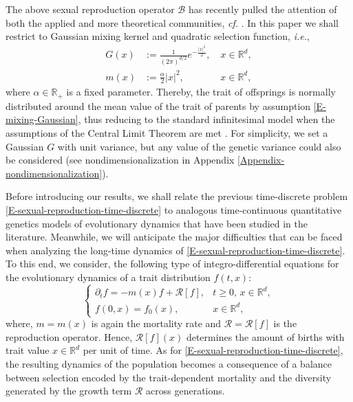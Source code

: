 \documentclass[reqno]{amsart}
\numberwithin{equation}{section}
\begin{document}
{The above sexual reproduction operator $\mathcal{B}$ has recently pulled the attention of both the applied and more theoretical communities, {\em cf.} \cite{BEV-17,CGP-19, MR-13, P-20-arxiv, R-17-arxiv, R-21-arxiv}. In this paper we shall restrict to Gaussian mixing kernel and quadratic selection function, {\em i.e.},
\begin{align}
G(x)&:=\frac{1}{(2\pi)^{d/2}}e^{-\frac{\vert x\vert^2}{2}},\quad x\in \mathbb{R}^d,\label{E-mixing-Gaussian}\\
m(x)&:=\frac{\alpha}{2}\vert x\vert^2, \hspace{45pt} x\in \mathbb{R}^d,\label{E-selection-quadratic}
\end{align}
where $\alpha\in \mathbb{R}_+$ is a fixed parameter. Thereby, the trait of offsprings is normally distributed around the mean value of the trait of parents by assumption \eqref{E-mixing-Gaussian}, thus reducing to the standard infinitesimal model when the assumptions of the Central Limit Theorem are met \cite{BEV-17}. For simplicity, we set a Gaussian $G$ with unit variance, but any value of the genetic variance could also be considered (see nondimensionalization in Appendix \ref{Appendix-nondimensionalization}). 

Before introducing our results, we shall relate the previous time-discrete problem \eqref{E-sexual-reproduction-time-discrete} to analogous time-continuous quantitative genetics models of evolutionary dynamics that have been studied in the literature. Meanwhile, we will anticipate the major difficulties that can be faced when analyzing the long-time dynamics of \eqref{E-sexual-reproduction-time-discrete}. To this end, we consider, the following type of integro-differential equations for the evolutionary dynamics of a trait distribution $f(t,x)$:
\begin{equation}\label{E-general-reproduction}
\left\{\begin{array}{ll}
\displaystyle\partial_t f=-m(x)f+\mathcal{R}[f], & t\geq 0,\,x\in \mathbb{R}^d,\\
\displaystyle f(0,x)=f_0(x), & x\in \mathbb{R}^d,
\end{array}\right.
\end{equation}
where, $m=m(x)$ is again the mortality rate and $\mathcal{R}=\mathcal{R}[f]$ is the reproduction operator. Hence, $\mathcal{R}[f](x)$ determines the amount of births with trait value $x\in \mathbb{R}^d$ per unit of time. As for \eqref{E-sexual-reproduction-time-discrete}, the resulting dynamics of the population becomes a consequence of a balance between selection encoded by the trait-dependent mortality and the diversity generated by the growth term $\mathcal{R}$ across generations.

}
\end{document}
